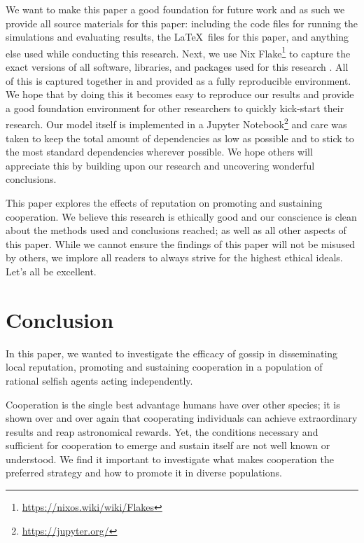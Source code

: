 \documentclass[english]{article}
\begin{document}
We want to make this paper a good foundation for future work and as such we provide all source materials for this paper: including the code files for running the simulations and evaluating results, the \LaTeX\ files for this paper, and anything else used while conducting this research.
Next, we use Nix Flake\footnote{\url{https://nixos.wiki/wiki/Flakes}} to capture the exact versions of all software, libraries, and packages used for this research \citep{nix}. All of this is captured together in and provided as a fully reproducible environment.
We hope that by doing this it becomes easy to reproduce our results and provide a good foundation environment for other researchers to quickly kick-start their research.
Our model itself is implemented in a Jupyter Notebook\footnote{\url{https://jupyter.org/}} and care was taken to keep the total amount of dependencies as low as possible and to stick to the most standard dependencies wherever possible.
We hope others will appreciate this by building upon our research and uncovering wonderful conclusions.

This paper explores the effects of reputation on promoting and sustaining cooperation.
We believe this research is ethically good and our conscience is clean about the methods used and conclusions reached; as well as all other aspects of this paper.
While we cannot ensure the findings of this paper will not be misused by others, we implore all readers to always strive for the highest ethical ideals.
Let's all be excellent.




\section{Conclusion}
In this paper, we wanted to investigate the efficacy of gossip in disseminating local reputation, promoting and sustaining cooperation in a population of rational selfish agents acting independently.

Cooperation is the single best advantage humans have over other species;
it is shown over and over again that cooperating individuals can achieve extraordinary results and reap astronomical rewards.
Yet, the conditions necessary and sufficient for cooperation to emerge and sustain itself are not well known or understood.
We find it important to investigate what makes cooperation the preferred strategy and how to promote it in diverse populations.
\end{document}
